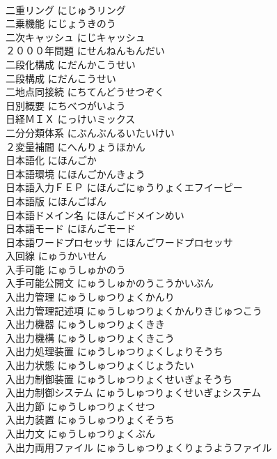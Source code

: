 \documentclass[8pt]{extreport}
\begin{document}
\begin{CJK}{UTF8}{min}
\\	二重リング	にじゅうリング	
\\	二乗機能	にじょうきのう	
\\	二次キャッシュ	にじキャッシュ	
\\	２０００年問題	にせんねんもんだい	
\\	二段化構成	にだんかこうせい	
\\	二段構成	にだんこうせい	
\\	二地点同接続	にちてんどうせつぞく	
\\	日別概要	にちべつがいよう	
\\	日経ＭＩＸ	にっけいミックス	
\\	二分分類体系	にぶんぶんるいたいけい	
\\	２変量補間	にへんりょうほかん	
\\	日本語化	にほんごか	
\\	日本語環境	にほんごかんきょう	
\\	日本語入力ＦＥＰ	にほんごにゅうりょくエフイーピー	
\\	日本語版	にほんごばん	
\\	日本語ドメイン名	にほんごドメインめい	
\\	日本語モード	にほんごモード	
\\	日本語ワードプロセッサ	にほんごワードプロセッサ	
\\	入回線	にゅうかいせん	
\\	入手可能	にゅうしゅかのう	
\\	入手可能公開文	にゅうしゅかのうこうかいぶん	
\\	入出力管理	にゅうしゅつりょくかんり	
\\	入出力管理記述項	にゅうしゅつりょくかんりきじゅつこう	
\\	入出力機器	にゅうしゅつりょくきき	
\\	入出力機構	にゅうしゅつりょくきこう	
\\	入出力処理装置	にゅうしゅつりょくしょりそうち	
\\	入出力状態	にゅうしゅつりょくじょうたい	
\\	入出力制御装置	にゅうしゅつりょくせいぎょそうち	
\\	入出力制御システム	にゅうしゅつりょくせいぎょシステム	
\\	入出力節	にゅうしゅつりょくせつ	
\\	入出力装置	にゅうしゅつりょくそうち	
\\	入出力文	にゅうしゅつりょくぶん	
\\	入出力両用ファイル	にゅうしゅつりょくりょうようファイル	

\end{CJK}
\end{document}
